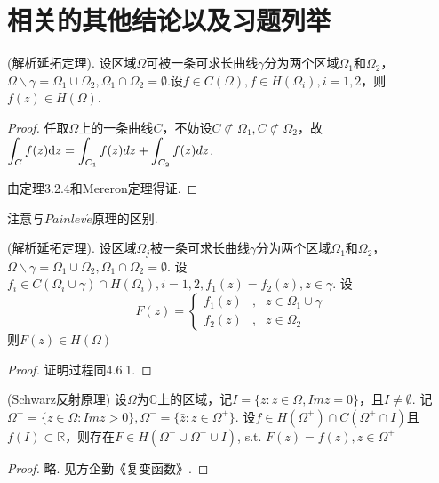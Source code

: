 \section{相关的其他结论以及习题列举}
\begin{mypro}
	\color{blue}
	(解析延拓定理).
	\color{black}
	设区域$\displaystyle{\Omega}$可被一条可求长曲线$\displaystyle{\gamma}$分为两个区域$\displaystyle{\Omega_1}$和$\displaystyle{\Omega_2}$，$\displaystyle{\Omega {\backslash} \gamma = \Omega_1 \cup \Omega_2, \Omega_1 \cap \Omega_2 = \emptyset}$.设$\displaystyle{f \in C(\Omega), f \in H(\Omega_i), i = 1,2}$，则$\displaystyle{f(z) \in H(\Omega)}$.
\end{mypro}
\begin{proof}
	任取$\displaystyle{\Omega}$上的一条曲线$\displaystyle{C}$，不妨设$\displaystyle{C \not\subset \Omega_1, C \not\subset \Omega_2}$，故$\displaystyle{\int_C f(z) \mathrm{d}z  = \int_{C_1} f(z) dz + \int_{C_2} f(z)dz}$.
	
	由定理3.2.4和{\rm Mereron}定理得证.
\end{proof}
注意与$Painlev\acute{e}$原理的区别.

\begin{mypro}
	\color{blue}
	(解析延拓定理).
	\color{black}
	设区域$\displaystyle{\Omega_j}$被一条可求长曲线$\displaystyle{\gamma}$分为两个区域$\displaystyle{\Omega_1}$和$\displaystyle{\Omega_2}$，$\displaystyle{\Omega {\backslash} \gamma = \Omega_1 \cup \Omega_2, \Omega_1 \cap \Omega_2 = \emptyset}$. 设$\displaystyle{f_i \in C(\Omega_i \cup \gamma) \cap H(\Omega_i), i=1,2, f_1(z) = f_2(z), z \in \gamma}$.
	设
	\begin{equation*}
	F(z) = \left\{
	\begin{aligned}
	f_1(z)& , & z \in \Omega_1 \cup \gamma \\ 
	f_2(z) & , & z \in \Omega_2
	\end{aligned}
	\right.
	\end{equation*}
	则$\displaystyle{F(z) \in H(\Omega)}$
\end{mypro}
\begin{proof}
	证明过程同4.6.1.
\end{proof}

\begin{mypro}
	\color{blue}
	({\rm Schwarz}反射原理)
	\color{black}
	设$\displaystyle{\Omega}$为$\displaystyle{\mathbb{C}}$上的区域，记$\displaystyle{I = \{ z: z \in \Omega, Imz = 0\}}$，且$\displaystyle{I \neq \emptyset}$. 记$\displaystyle{\Omega^+ = \{ z \in \Omega : Im z >0\} ,  \Omega^- = \{ \bar{z} : z \in \Omega^+ \}}$. 设$\displaystyle{f \in H(\Omega^+) \cap C(\Omega ^ + \cap I)}$且$\displaystyle{f(I) \subset \mathbb{R}}$，则存在$\displaystyle{F \in H(\Omega^+ \cup \Omega^- \cup I)}$, s.t. $\displaystyle{F(z) = f(z), z \in \Omega^+}$
\end{mypro}
\begin{proof}
	略. 见方企勤《复变函数》.
\end{proof}

